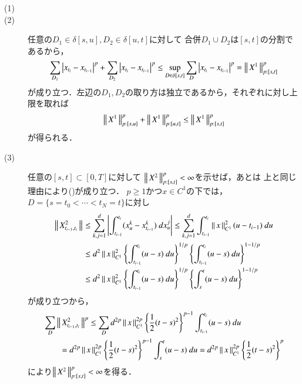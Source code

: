 	\begin{thm}\mbox{}
		\begin{description}
			\item[(1)]
			\item[(2)] 任意の$D_1 \in \delta[s,u],D_2 \in \delta[u,t]$に対して
				合併$D_1 \cup D_2$は$[s,t]$の分割であるから，
				\begin{align}
					\sum_{D_1}\left| x_{t_i} - x_{t_{i-1}} \right|^p
					+ \sum_{D_2}\left| x_{t_i} - x_{t_{i-1}} \right|^p
					\leq \operatorname*{sup}_{D \in \delta[s,t]} \sum_{D} \left| x_{t_i} - x_{t_{i-1}} \right|^p
					= \left\|\, X^1\, \right\|_{p:[s,t]}^p
				\end{align}
				が成り立つ．左辺の$D_1,D_2$の取り方は独立であるから，それぞれに対し上限を取れば
				\begin{align}
					\left\|\, X^1\, \right\|_{p:[s,u]}^p + \left\|\, X^1\, \right\|_{p:[u,t]}^p
					\leq \left\|\, X^1\, \right\|_{p:[s,t]}^p
				\end{align}
				が得られる．
				
			\item[(3)] 任意の$[s,t] \subset [0,T]$に対して
				$\left\|\, X^2\, \right\|_{p:[s,t]}^p < \infty$を示せば，あとは
				上と同じ理由により()が成り立つ．
				$p \geq 1$かつ$x \in C^1$の下では，$D = \{s=t_0 < \cdots < t_N = t\}$に対し
				\begin{align}
					\left\|\, X^2_{t_{i-1},t_i}\, \right\|_{}
					&\leq \sum_{k,j=1}^d \left| \int_{t_{i-1}}^{t_i} (x^k_u - x^k_{t_{i-1}})\ dx^j_u \right|
					\leq \sum_{k,j=1}^d \int_{t_{i-1}}^{t_i} \left\|\, x\, \right\|_{C^1}^2(u-t_{i-1})\ du \\
					&\leq d^2 \left\|\, x\, \right\|_{C^1}^2 \left\{ \int_{t_{i-1}}^{t_i} (u-s)\ du \right\}^{1/p}
						\left\{ \int_{t_{i-1}}^{t_i} (u-s)\ du \right\}^{1-1/p} \\
					&\leq d^2 \left\|\, x\, \right\|_{C^1}^2 \left\{ \int_{t_{i-1}}^{t_i} (u-s)\ du \right\}^{1/p}
						\left\{ \int_s^t (u-s)\ du \right\}^{1-1/p}
				\end{align}
				が成り立つから，
				\begin{align}
					&\sum_D \left\|\, X^2_{t_{i-1},t_i}\, \right\|_{}^p
					\leq \sum_D d^{2p}\left\|\, x\, \right\|_{C^1}^{2p} \left\{ \frac{1}{2}(t-s)^2 \right\}^{p-1}
						\int_{t_{i-1}}^{t_i} (u-s)\ du \\
					&\qquad= d^{2p}\left\|\, x\, \right\|_{C^1}^{2p} \left\{ \frac{1}{2}(t-s)^2 \right\}^{p-1}
						\int_s^t (u-s)\ du
					= d^{2p}\left\|\, x\, \right\|_{C^1}^{2p} \left\{ \frac{1}{2}(t-s)^2 \right\}^p
				\end{align}
				により$\left\|\, X^2\, \right\|_{p:[s,t]}^p < \infty$を得る．
				\QED
		\end{description}
	\end{thm}
	
